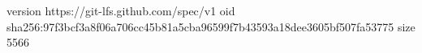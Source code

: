 version https://git-lfs.github.com/spec/v1
oid sha256:97f3bcf3a8f06a706cc45b81a5cba96599f7b43593a18dee3605bf507fa53775
size 5566
